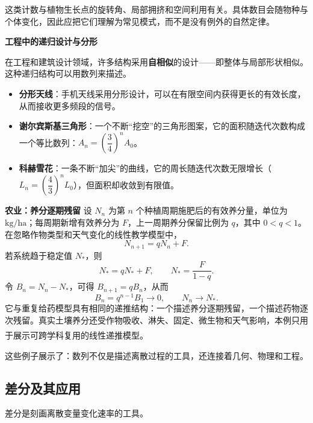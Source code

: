 \documentclass[fontset=fandol]{ctexart}
\newcommand{\upcite}[1]{\textsuperscript{\textsuperscript{\cite{#1}}}}
\begin{document}
\begin{center}
\end{center}

这类计数与植物生长点的旋转角、局部拥挤和空间利用有关。具体数目会随物种与个体变化，因此应把它们理解为常见模式，而不是没有例外的自然定律。


\textbf{工程中的递归设计与分形}

在工程和建筑设计领域，许多结构采用\textbf{自相似}的设计——即整体与局部形状相似。这种递归结构可以用数列来描述。

\begin{itemize}
\item \textbf{分形天线}：手机天线采用分形设计，可以在有限空间内获得更长的有效长度，从而接收更多频段的信号。
\item \textbf{谢尔宾斯基三角形}：一个不断“挖空”的三角形图案，它的面积随迭代次数构成一个等比数列：\(A_n = \left(\dfrac{3}{4}\right)^n A_0\)。
\item \textbf{科赫雪花}：一条不断“加尖”的曲线，它的周长随迭代次数无限增长（\(L_n = \left(\dfrac{4}{3}\right)^n L_0\)），但面积却收敛到有限值。
\end{itemize}




\textbf{农业：养分逐期残留}
设 $N_n$ 为第 $n$ 个种植周期施肥后的有效养分量，单位为 $\mathrm{kg/ha}$；每周期新增有效养分为 $F$，上一周期养分保留比例为 $q$，其中 $0<q<1$。在忽略作物类型和天气变化的线性教学模型中，
\[
N_{n+1}=qN_n+F.
\]
若系统趋于稳定值 $N_*$，则
\[
N_*=qN_*+F,\qquad N_*=\frac{F}{1-q}.
\]
令 $B_n=N_n-N_*$，可得 $B_{n+1}=qB_n$，从而
\[
B_n=q^{n-1}B_1\to0,\qquad N_n\to N_*.
\]
它与重复给药模型具有相同的递推结构：一个描述养分逐期残留，一个描述药物逐次残留。真实土壤养分还受作物吸收、淋失、固定、微生物和天气影响，本例只用于展示可跨学科复用的线性递推模型。\upcite{BradyWeil}

这些例子展示了：数列不仅是描述离散过程的工具，还连接着几何、物理和工程。
\subsection{差分及其应用}

差分是刻画离散变量变化速率的工具。
\end{document}
